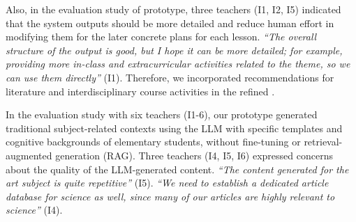 Also, in the evaluation study of \name{} prototype, three teachers (I1, I2, I5) indicated that the system outputs should be more detailed and reduce human effort in modifying them for the later concrete plans for each lesson. %
\textit{``The overall structure of the output is good, but I hope it can be more detailed; for example, providing more in-class and extracurricular activities related to the theme, so we can use them directly''} (I1). Therefore, we incorporated recommendations for literature and interdisciplinary course activities in the refined \name{}.

In the evaluation study with six teachers (I1-6), our prototype generated traditional subject-related contexts using the LLM with specific templates and cognitive backgrounds of elementary students, without fine-tuning or retrieval-augmented generation (RAG). 
Three teachers (I4, I5, I6) expressed concerns about the quality of the LLM-generated content. \textit{``The content generated for the art subject is quite repetitive''} (I5). \textit{``We need to establish a dedicated article database for science as well, since many of our articles are highly relevant to science''} (I4). 


